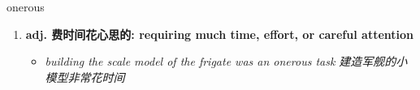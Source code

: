 
\begin{frame}
{\huge onerous}
\begin{center}
\begin{enumerate}\Large
  \item \textbf{adj. 费时间花心思的: requiring much time, effort, or careful attention}
  \begin{itemize}
    \item \em{\Large{building the scale model of the frigate was an onerous task 建造军舰的小模型非常花时间}}
  \end{itemize}
\end{enumerate}
\end{center}
\end{frame}
